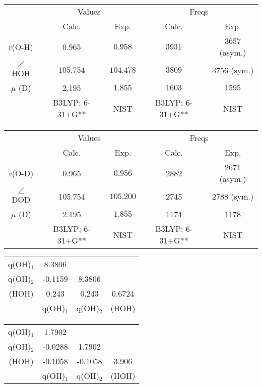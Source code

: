 \documentclass[12pt]{article}
\begin{document}
\begin{tabular}{ccccc}
\toprule
& \multicolumn{2}{c}{Values} & \multicolumn{2}{c}{Freqs} \\
\cmidrule(r){2-3} \cmidrule(r){4-5}  
& Calc. & Exp. & Calc. & Exp. \\
\cmidrule(r){2-3} \cmidrule(r){4-5}
r(O-H) & 0.965 & $0.958$ & $3931$ & 3657 (asym.) \\
$\angle$ HOH & $105.754$ & $104.478$ & $3809$ & 3756 (sym.) \\
$\mu$ (D) & 2.195 & $1.855$ & $1603$ & $1595$ \\
	       & B3LYP; 6-31+G** & NIST & B3LYP; 6-31+G** & NIST \\
\bottomrule
\end{tabular}

\begin{tabular}{ccccc}
\toprule
& \multicolumn{2}{c}{Values} & \multicolumn{2}{c}{Freqs} \\
\cmidrule(r){2-3} \cmidrule(r){4-5}  
& Calc. & Exp. & Calc. & Exp. \\
\cmidrule(r){2-3} \cmidrule(r){4-5}
r(O-D) & 0.965 & $0.956$ & 2882 & 2671 (asym.) \\
$\angle$ DOD & 105.754 & $105.200 $ & 2745 & 2788 (sym.) \\
$\mu$ (D) & 2.195  & $1.855$ & 1174 & 1178 \\
	       & B3LYP; 6-31+G** & NIST & B3LYP; 6-31+G** & NIST \\
\bottomrule
\end{tabular}


\begin{minipage}{0.5\linewidth}
\begin{tabular}{cccc}
\toprule
q(OH)$_1$ & 8.3806 & &  \\
q(OH)$_2$ & -0.1159 & 8.3806 & \\
(HOH) & 0.243 & 0.243 & 0.6724 \\
      & q(OH)$_1$ & q(OH)$_2$ & (HOH) \\
\bottomrule
\end{tabular}
\end{minipage}
\begin{minipage}{0.5\linewidth}
\begin{tabular}{cccc}
\toprule
q(OH)$_1$ & 1.7902 & &  \\
q(OH)$_2$ & -0.0288 & 1.7902 & \\
(HOH) & -0.1058 & -0.1058 & 3.906 \\
      & q(OH)$_1$ & q(OH)$_2$ & (HOH) \\
\bottomrule
\end{tabular}
\end{minipage}
\end{document}
